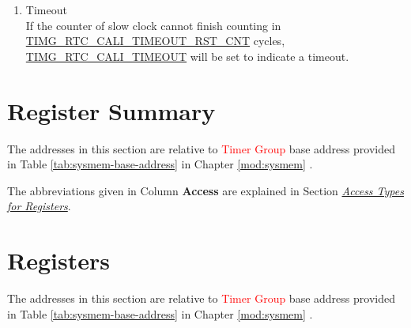 \documentclass[main\_\_EN.tex]{subfiles}
\begin{document}
\begin{enumerate}
\begin{itemize}
        \item When \hyperref[fielddesc:TIMGRTCCALICYCLINGDATAVLD]{TIMG\_RTC\_CALI\_CYCLING\_DATA\_VLD} is 1, \hyperref[fielddesc:TIMGRTCCALIVALUE]{TIMG\_RTC\_CALI\_VALUE} is valid.
    \end{itemize}
    \item Timeout\\
    If the counter of slow clock cannot finish counting in \hyperref[fielddesc:TIMGRTCCALITIMEOUTRSTCNT]{TIMG\_RTC\_CALI\_TIMEOUT\_RST\_CNT} cycles, \\\hyperref[fielddesc:TIMGRTCCALITIMEOUT]{TIMG\_RTC\_CALI\_TIMEOUT} will be set to indicate a timeout.
\end{enumerate}





\newpage
\hypertarget{timg-reg-summ}{}
\section{Register Summary}
\label{sec:timg-reg-summ}

The addresses in this section are relative to \textcolor{red}{Timer Group} base address provided in Table \ref{tab:sysmem-base-address} in Chapter \ref{mod:sysmem} \textit{}.

The abbreviations given in Column \textbf{Access} are explained in Section \hyperref[glossary-access-types]{\textit{Access Types for Registers}}.






\newpage
\section{Registers}

The addresses in this section are relative to \textcolor{red}{Timer Group} base address provided in Table \ref{tab:sysmem-base-address} in Chapter \ref{mod:sysmem} \textit{}.


\end{document}
